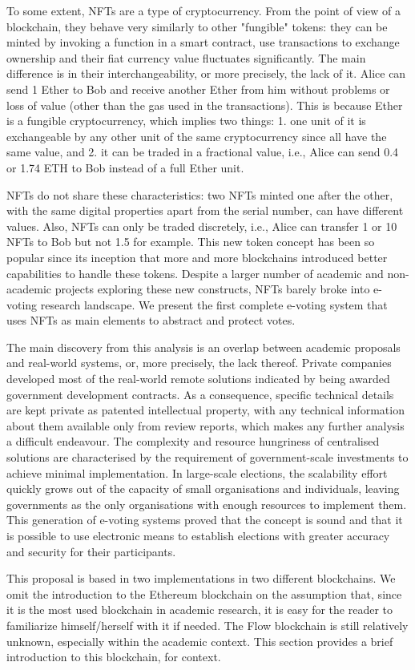 To some extent, NFTs are a type of cryptocurrency. From the point of view of a blockchain, they behave very similarly to other "fungible" tokens: they can be minted by invoking a function in a smart contract, use transactions to exchange ownership and their fiat currency value fluctuates significantly. The main difference is in their interchangeability, or more precisely, the lack of it. Alice can send 1 Ether to Bob and receive another Ether from him without problems or loss of value (other than the gas used in the transactions). This is because Ether is a fungible cryptocurrency, which implies two things: 1. one unit of it is exchangeable by any other unit of the same cryptocurrency since all have the same value, and 2. it can be traded in a fractional value, i.e., Alice can send 0.4 or 1.74 ETH to Bob instead of a full Ether unit.
\par
NFTs do not share these characteristics: two NFTs minted one after the other, with the same digital properties apart from the serial number, can have different values. Also, NFTs can only be traded discretely, i.e., Alice can transfer 1 or 10 NFTs to Bob but not 1.5 for example.
This new token concept has been so popular since its inception that more and more blockchains introduced better capabilities to handle these tokens. Despite a larger number of academic and non-academic projects exploring these new constructs, NFTs barely broke into e-voting research landscape. We present the first complete e-voting system that uses NFTs as main elements to abstract and protect votes.


The main discovery from this analysis is an overlap between academic proposals and real-world systems, or, more precisely, the lack thereof. Private companies developed most of the real-world remote solutions indicated by being awarded government development contracts. As a consequence, specific technical details are kept private as patented intellectual property, with any technical information about them available only from review reports, which makes any further analysis a difficult endeavour. The complexity and resource hungriness of centralised solutions are characterised by the requirement of government-scale investments to achieve minimal implementation. In large-scale elections, the scalability effort quickly grows out of the capacity of small organisations and individuals, leaving governments as the only organisations with enough resources to implement them. This generation of e-voting systems proved that the concept is sound and that it is possible to use electronic means to establish elections with greater accuracy and security for their participants.

This proposal is based in two implementations in two different blockchains. We omit the introduction to the Ethereum blockchain on the assumption that, since it is the most used blockchain in academic research, it is easy for the reader to familiarize himself/herself with it if needed. The Flow blockchain is still relatively unknown, especially within the academic context. This section provides a brief introduction to this blockchain, for context.
\par



